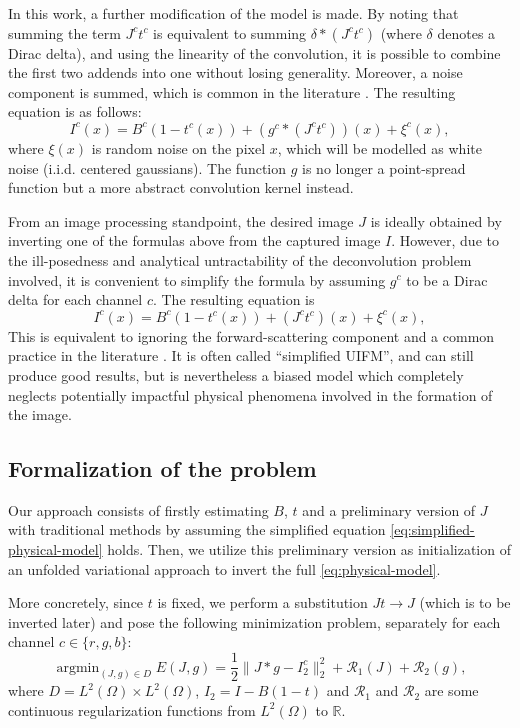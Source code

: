 \documentclass[twocolumn,twoside,a4paper,10pt]{IEEEtran}
\DeclareMathOperator*{\argmin}{\operatorname*{argmin}}
\DeclareMathOperator*{\argmin}{arg\,min}
\begin{document}
In this work, a further modification of the model is made. By noting that summing the term \(J^ct^c\) is equivalent to summing \(\delta\ast(J^ct^c)\) (where \(\delta\) denotes a Dirac delta), and using the linearity of the convolution, it is possible to combine the first two addends into one without 
losing generality. Moreover, a noise component is summed, which is common in the literature \cite{xie2021variational}. The resulting equation is as follows:
\begin{equation}\label{eq:physical-model}
  I^c(x) = B^c\left(1 - t^c(x)\right) + \left(g^c\ast\left(J^c t^c\right)\right) (x) + \xi^c(x),
\end{equation}
where \(\xi(x)\) is random noise on the pixel \(x\), which will be modelled as white noise (i.i.d. centered gaussians). The function \(g\) is no longer a point-spread function but a more abstract convolution kernel instead.

From an image processing standpoint, the desired image \(J\) is ideally obtained by inverting one of the formulas above from the captured image \(I\). However, due to the ill-posedness and analytical untractability of the deconvolution problem involved, it is convenient to simplify the formula by assuming \(g^c\) to be a Dirac delta for each channel \(c\). The resulting equation is
\begin{equation}\label{eq:simplified-physical-model}
  I^c(x) = B^c\left(1 - t^c(x)\right) + \left(J^c t^c\right) (x) + \xi^c(x),
\end{equation}
This is equivalent to ignoring the forward-scattering component and a common practice in the literature \cite{ancuti2017color}. It is often called ``simplified UIFM'', and can still produce good results, but is nevertheless a biased model which completely neglects potentially impactful physical phenomena involved in the formation of the image.

\subsection{Formalization of the problem}
Our approach consists of firstly estimating \(B\), \(t\) and a preliminary version of \(J\) with traditional methods by assuming the simplified equation \cref{eq:simplified-physical-model} holds. Then, we utilize this preliminary version as initialization of an unfolded variational approach to invert the full \cref{eq:physical-model}.

More concretely, since \(t\) is fixed, we perform a substitution \(Jt\to J\) (which is to be inverted later) and pose the following minimization problem, separately for each channel \(c\in\{r, g, b\}\):
\begin{equation}\label{eq:full-I2-functional}
  \argmin_{(J, g)\in D} E(J, g) = \frac12\|J\ast g - I_2^c\|_2^2 + \mathcal{R}_1(J) + \mathcal{R}_2(g),
\end{equation}
where \(D = L^2(\Omega)\times L^2(\Omega)\), \(I_2 = I - B(1-t)\) and \(\mathcal{R}_1\) and \(\mathcal{R}_2\) are some continuous regularization functions from \(L^2(\Omega)\) to \(\mathbb{R}\). 
\end{document}
